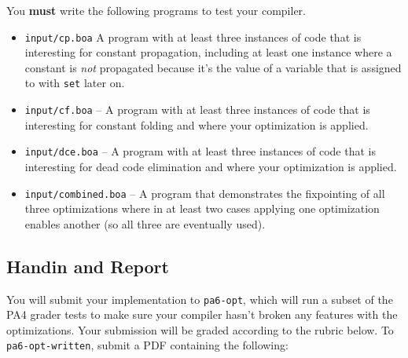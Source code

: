 \documentclass[10pt, oneside]{article}
\begin{document}
You {\bf must} write the following programs to test your compiler.

\begin{itemize}

\item {\tt input/cp.boa} A program with at least three instances of code that
is interesting for constant propagation, including at least one instance
where a constant is {\it not} propagated because it's the value of a variable
that is assigned to with {\tt set} later on.

\item {\tt input/cf.boa} -- A program with at least three instances of code
that is interesting for constant folding and where your optimization is
applied.

\item {\tt input/dce.boa} -- A program with at least three instances of code
that is interesting for dead code elimination and where your optimization is
applied.

\item {\tt input/combined.boa} -- A program that demonstrates the fixpointing
of all three optimizations where in at least two cases applying one
optimization enables another (so all three are eventually used).

\end{itemize}

\subsection*{Handin and Report}

You will submit your implementation to {\tt pa6-opt}, which will run a subset
of the PA4 grader tests to make sure your compiler hasn't broken any features
with the optimizations. Your submission will be graded according to the
rubric below. To {\tt pa6-opt-written}, submit a PDF containing the
following:
\end{document}
